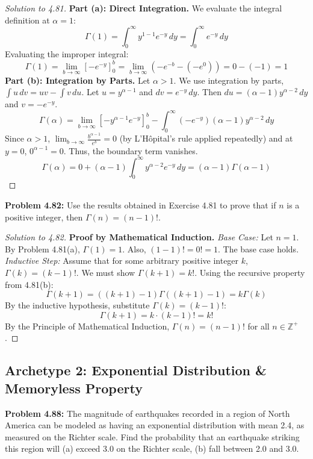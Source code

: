 \documentclass[11pt, a4paper]{article}
\theoremstyle{definition}
\theoremstyle{remark}
\newcommand{\Z}{\mathbb{Z}}
\begin{document}
\begin{proof}[Solution to 4.81]
\textbf{Part (a): Direct Integration.}
We evaluate the integral definition at $\alpha = 1$:
\[ \Gamma(1) = \int_0^\infty y^{1-1} e^{-y} \, dy = \int_0^\infty e^{-y} \, dy \]
Evaluating the improper integral:
\[ \Gamma(1) = \lim_{b \to \infty} \left[ -e^{-y} \right]_0^b = \lim_{b \to \infty} (-e^{-b} - (-e^0)) = 0 - (-1) = 1 \]
\textbf{Part (b): Integration by Parts.}
Let $\alpha > 1$. We use integration by parts, $\int u \, dv = uv - \int v \, du$.
Let $u = y^{\alpha-1}$ and $dv = e^{-y} \, dy$.
Then $du = (\alpha-1)y^{\alpha-2} \, dy$ and $v = -e^{-y}$.
\[ \Gamma(\alpha) = \lim_{b \to \infty} \left[ -y^{\alpha-1}e^{-y} \right]_0^b - \int_0^\infty (-e^{-y})(\alpha-1)y^{\alpha-2} \, dy \]
Since $\alpha > 1$, $\lim_{b \to \infty} \frac{b^{\alpha-1}}{e^b} = 0$ (by L'Hôpital's rule applied repeatedly) and at $y=0$, $0^{\alpha-1} = 0$. Thus, the boundary term vanishes.
\[ \Gamma(\alpha) = 0 + (\alpha-1) \int_0^\infty y^{\alpha-2} e^{-y} \, dy = (\alpha-1)\Gamma(\alpha-1) \]
\end{proof}

\textbf{Problem 4.82:} Use the results obtained in Exercise 4.81 to prove that if $n$ is a positive integer, then $\Gamma(n) = (n-1)!$.

\begin{proof}[Solution to 4.82]
\textbf{Proof by Mathematical Induction.}
\textit{Base Case:} Let $n = 1$. By Problem 4.81(a), $\Gamma(1) = 1$. Also, $(1-1)! = 0! = 1$. The base case holds.
\textit{Inductive Step:} Assume that for some arbitrary positive integer $k$, $\Gamma(k) = (k-1)!$. We must show $\Gamma(k+1) = k!$.
Using the recursive property from 4.81(b):
\[ \Gamma(k+1) = ((k+1)-1)\Gamma((k+1)-1) = k\Gamma(k) \]
By the inductive hypothesis, substitute $\Gamma(k) = (k-1)!$:
\[ \Gamma(k+1) = k \cdot (k-1)! = k! \]
By the Principle of Mathematical Induction, $\Gamma(n) = (n-1)!$ for all $n \in \Z^+$.
\end{proof}

\subsection{Archetype 2: Exponential Distribution \& Memoryless Property}

\textbf{Problem 4.88:} The magnitude of earthquakes recorded in a region of North America can be modeled as having an exponential distribution with mean 2.4, as measured on the Richter scale. Find the probability that an earthquake striking this region will (a) exceed 3.0 on the Richter scale, (b) fall between 2.0 and 3.0.
\end{document}
